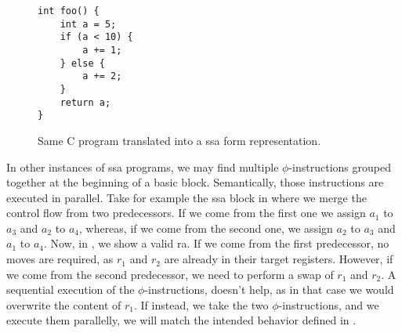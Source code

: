 \begin{figure}[ht]
\centering
\begin{minipage}{0.38\textwidth}
\lstset{style=C}
\begin{lstlisting}[caption={C program merging variables at line 8.}, label={fig:ssabefore}]
int foo() {
    int a = 5;
    if (a < 10) {
        a += 1;
    } else {
        a += 2;
    }
    return a;
}
\end{lstlisting}
\end{minipage}
\hfill
\begin{minipage}{0.58\textwidth}
  \centering
  \caption{Same C program translated into a \gls{ssa} form representation.}
  \label{fig:ssaafter}
\end{minipage}
\end{figure}

In other instances of \gls{ssa} programs, we may find multiple $\phi$-instructions grouped together at the beginning of a basic block. Semantically, those instructions are executed in parallel.
Take for example the \gls{ssa} block in  where we merge the control flow from two predecessors. If we come from the first one we assign $a_1$ to $a_3$ and $a_2$ to $a_4$, whereas, if we come from the second one, we assign $a_2$ to $a_3$ and $a_1$ to $a_4$. Now, in , we show a valid \gls{ra}. If we come from the first predecessor, no moves are required, as $r_1$ and $r_2$ are already in their target registers.
However, if we come from the second predecessor, we need to perform a swap of $r_1$ and $r_2$. A sequential execution of the $\phi$-instructions, doesn't help, as in that case we would overwrite the content of $r_1$. If instead, we take the two $\phi$-instructions, and we execute them parallelly, we will match the intended behavior defined in .

